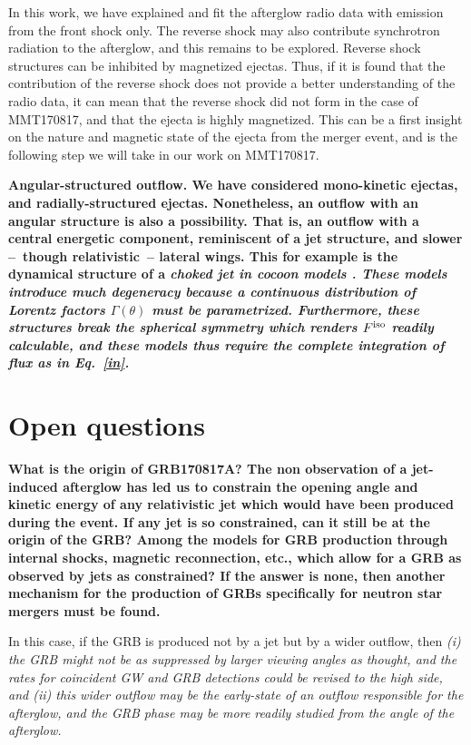 In this work, we have explained and fit the afterglow radio data with emission from the front shock only. The reverse shock may also contribute synchrotron radiation to the afterglow, and this remains to be explored. Reverse shock structures can be inhibited by magnetized ejectas. Thus, if it is found that the contribution of the reverse shock does not provide a better understanding of the radio data, it can mean that the reverse shock did not form in the case of MMT170817, and that the ejecta is highly magnetized. This can be a first insight on the nature and magnetic state of the ejecta from the merger event, and is the following step we will take in our work on MMT170817.


\bf{Angular-structured outflow.} We have considered mono-kinetic ejectas, and radially-structured ejectas. Nonetheless, an outflow with an angular structure is also a possibility. That is, an outflow with a central energetic component, reminiscent of a jet structure, and slower --~though relativistic~-- lateral wings. This for example is the dynamical structure of a \it{choked jet} in cocoon models \citep{42, 5}. These models introduce much degeneracy because a continuous distribution of Lorentz factors $\Gamma(\theta)$ must be parametrized. Furthermore, these structures break the spherical symmetry which renders $F^{\rm{iso}}$ readily calculable, and these models thus require the complete integration of flux as in Eq.~\ref{in}.

\section{Open questions}

\bf{What is the origin of GRB170817A? }The non observation of a jet-induced afterglow has led us to constrain the opening angle and kinetic energy of any relativistic jet which would have been produced during the event. If any jet is so constrained, can it still be at the origin of the GRB? Among the models for GRB production through internal shocks, magnetic reconnection, etc., which allow for a GRB as observed by jets as constrained? If the answer is none, then another mechanism for the production of GRBs specifically for neutron star mergers must be found.

In this case, if the GRB is produced not by a jet but by a wider outflow, then \it{(i)} the GRB might not be as suppressed by larger viewing angles as thought, and the rates for coincident GW and GRB detections could be revised to the high side, and \it{(ii)} this wider outflow may be the early-state of an outflow responsible for the afterglow, and the GRB phase may be more readily studied from the angle of the afterglow.

